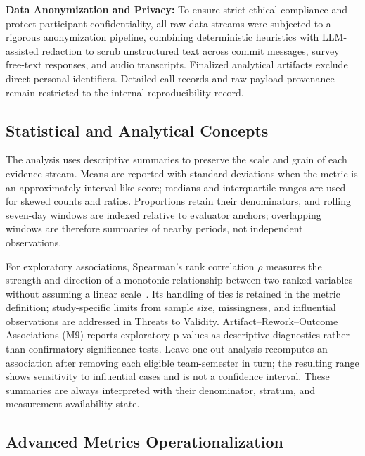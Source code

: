 \textbf{Data Anonymization and Privacy:} To ensure strict ethical compliance and protect participant confidentiality, all raw data streams were subjected to a rigorous anonymization pipeline, combining deterministic heuristics with LLM-assisted redaction to scrub unstructured text across commit messages, survey free-text responses, and audio transcripts. Finalized analytical artifacts exclude direct personal identifiers. Detailed call records and raw payload provenance remain restricted to the internal reproducibility record.

\subsection{Statistical and Analytical Concepts}

The analysis uses descriptive summaries to preserve the scale and grain of each
evidence stream. Means are reported with standard deviations when the metric is
an approximately interval-like score; medians and interquartile ranges are used
for skewed counts and ratios. Proportions retain their denominators, and rolling
seven-day windows are indexed relative to evaluator anchors; overlapping windows
are therefore summaries of nearby periods, not independent observations.

For exploratory associations, Spearman's rank correlation $\rho$ measures the
strength and direction of a monotonic relationship between two ranked variables
without assuming a linear scale~\cite{spearman1904proof}. Its handling of ties
is retained in the metric definition; study-specific limits from sample size,
missingness, and influential observations are addressed in Threats to Validity.
Artifact--Rework--Outcome Associations (M9) reports exploratory p-values as
descriptive diagnostics rather than
confirmatory significance tests. Leave-one-out analysis
recomputes an association after removing each eligible team-semester in turn;
the resulting range shows sensitivity to influential cases and is not a
confidence interval. These summaries are always interpreted with their
denominator, stratum, and measurement-availability state.

\subsection{Advanced Metrics Operationalization}
\label{sec:advanced-metrics}

